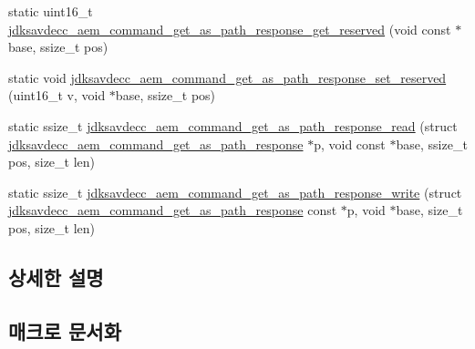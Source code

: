 \begin{DoxyCompactItemize}
\item 
static uint16\+\_\+t \hyperlink{group__command__get__as__path__response_ga6b5017437e2ef081722fb45cd7e21a22}{jdksavdecc\+\_\+aem\+\_\+command\+\_\+get\+\_\+as\+\_\+path\+\_\+response\+\_\+get\+\_\+reserved} (void const $\ast$base, ssize\+\_\+t pos)
\item 
static void \hyperlink{group__command__get__as__path__response_ga3be39ed1692a046c3f6e262ffa89cf09}{jdksavdecc\+\_\+aem\+\_\+command\+\_\+get\+\_\+as\+\_\+path\+\_\+response\+\_\+set\+\_\+reserved} (uint16\+\_\+t v, void $\ast$base, ssize\+\_\+t pos)
\item 
static ssize\+\_\+t \hyperlink{group__command__get__as__path__response_ga637f859611d32477f7a66b2245a3ff4c}{jdksavdecc\+\_\+aem\+\_\+command\+\_\+get\+\_\+as\+\_\+path\+\_\+response\+\_\+read} (struct \hyperlink{structjdksavdecc__aem__command__get__as__path__response}{jdksavdecc\+\_\+aem\+\_\+command\+\_\+get\+\_\+as\+\_\+path\+\_\+response} $\ast$p, void const $\ast$base, ssize\+\_\+t pos, size\+\_\+t len)
\item 
static ssize\+\_\+t \hyperlink{group__command__get__as__path__response_ga229937686b3f3769c3487636466b4db0}{jdksavdecc\+\_\+aem\+\_\+command\+\_\+get\+\_\+as\+\_\+path\+\_\+response\+\_\+write} (struct \hyperlink{structjdksavdecc__aem__command__get__as__path__response}{jdksavdecc\+\_\+aem\+\_\+command\+\_\+get\+\_\+as\+\_\+path\+\_\+response} const $\ast$p, void $\ast$base, size\+\_\+t pos, size\+\_\+t len)
\end{DoxyCompactItemize}


\subsection{상세한 설명}


\subsection{매크로 문서화}
